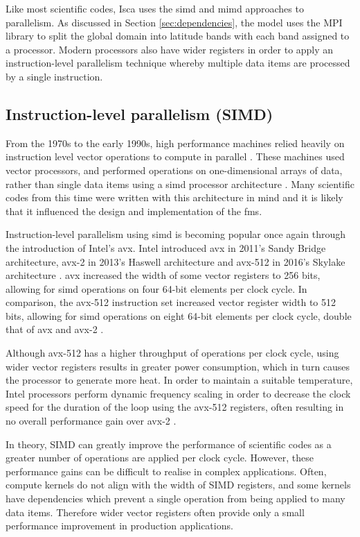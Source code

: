 \documentclass[a4paper,11pt]{report}
\begin{document}
\par
Like most scientific codes, Isca uses the \gls{simd} and \gls{mimd} approaches to parallelism. As discussed in Section \ref{sec:dependencies}, the model uses the MPI library to split the global domain into latitude bands with each band assigned to a processor. Modern processors also have wider registers in order to apply an instruction-level parallelism technique whereby multiple data items are processed by a single instruction. 

\subsection{Instruction-level parallelism (SIMD)}
From the 1970s to the early 1990s, high performance machines relied heavily on instruction level vector operations to compute in parallel \cite{6877473}. These machines used vector processors, and performed operations on one-dimensional arrays of data, rather than single data items using a \gls{simd} processor architecture \cite{conte2000long}. Many scientific codes from this time were written with this architecture in mind and it is likely that it influenced the design and implementation of the \gls{fms}. 
\par
Instruction-level parallelism using \gls{simd} is becoming popular once again through the introduction of Intel's \gls{avx}. Intel introduced \gls{avx} in 2011's Sandy Bridge architecture, \gls{avx}-2 in 2013's Haswell architecture and \gls{avx}-512 in 2016's Skylake architecture \cite{chris2011avx, intel2019avx}. \gls{avx} increased the width of some vector registers to 256 bits, allowing for \gls{simd} operations on four 64-bit elements per clock cycle. In comparison, the \gls{avx}-512 instruction set increased vector register width to 512 bits, allowing for \gls{simd} operations on eight 64-bit elements per clock cycle, double that of \gls{avx} and \gls{avx}-2 \cite{chris2011avx,xeon2680v4}.
\par
Although \gls{avx}-512 has a higher throughput of operations per clock cycle, using wider vector registers results in greater power consumption, which in turn causes the processor to generate more heat. In order to maintain a suitable temperature, Intel processors perform dynamic frequency scaling in order to decrease the clock speed for the duration of the loop using the \gls{avx}-512 registers, often resulting in no overall performance gain over \gls{avx}-2 \cite{gottschlag2018mechanism}.
\par
In theory, SIMD can greatly improve the performance of scientific codes as a greater number of operations are applied per clock cycle. However, these performance gains can be difficult to realise in complex applications. Often, compute kernels do not align with the width of SIMD registers, and some kernels have dependencies which prevent a single operation from being applied to many data items. Therefore wider vector registers often provide only a small performance improvement in production applications.
\end{document}
